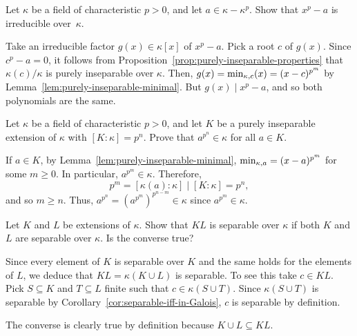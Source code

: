 \begin{probl}
    Let\/ $\kappa$ be a field of characteristic\/ $p > 0$, and let\/ $a \in \kappa - \kappa^p$. Show that\/ $x^p - a$ is irreducible over\/~$\kappa$.
\end{probl}

\begin{solution}
    Take an irreducible factor $g(x)\in\kappa[x]$ of $x^p-a$. Pick a root $c$ of $g(x)$. Since $c^p-a=0$, it follows from  Proposition~\ref{prop:purely-inseparable-properties} that $\kappa(c)/\kappa$ is purely inseparable over $\kappa$. Then, $g(x)=\operatorname{min}_{\kappa,c}(x)=(x-c)^{p^m}$ by Lemma~\ref{lem:purely-inseparable-minimal}. But $g(x)\mid x^p-a$, and so both polynomials are the same.
\end{solution}

\begin{probl}
    Let\/ $\kappa$ be a field of characteristic\/ $p > 0$, and let\/ $K$ be a purely inseparable extension of\/ $\kappa$ with\/ $[K : \kappa] = p^n$. Prove that\/ $a^{p^n} \in \kappa$ for all\/ $a \in K$.
\end{probl}

\begin{solution}
    If $a\in K$, by Lemma~\ref{lem:purely-inseparable-minimal}, $\operatorname{min}_{\kappa,a}=(x-a)^{p^m}$ for some $m\ge0$. In particular, $a^{p^m}\in\kappa$. Therefore,
    $$
        p^m=[\kappa(a):\kappa]\mid[K:\kappa]=p^n,
    $$
    and so $m\ge n$. Thus, $a^{p^n}=(a^{p^m})^{p^{n-m}}\in\kappa$ since $a^{p^m}\in\kappa$.
\end{solution}

\begin{probl}\label{probl:separable.separable=separable}
    Let\/ $K$ and\/ $L$ be extensions of\/ $\kappa$. Show that\/ $KL$ is separable over\/ $\kappa$ if both\/ $K$ and\/ $L$ are separable over\/ $\kappa$. Is the converse true?
\end{probl}

\begin{solution}
    Since every element of $K$ is separable over $K$ and the same holds for the elements of $L$, we deduce that $KL=\kappa(K\cup L)$ is separable. To see this take $c\in KL$. Pick $S\subseteq K$ and $T\subseteq L$ finite such that $c\in\kappa(S\cup T)$. Since $\kappa(S\cup T)$ is separable by Corollary~\ref{cor:separable-iff-in-Galois}, $c$ is separable by definition.

    The converse is clearly true by definition because $K\cup L\subseteq KL$.
\end{solution}

